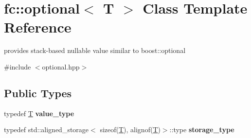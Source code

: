 \hypertarget{classfc_1_1optional}{}\section{fc\+:\+:optional$<$ T $>$ Class Template Reference}
\label{classfc_1_1optional}


provides stack-\/based nullable value similar to boost\+::optional  




{\ttfamily \#include $<$optional.\+hpp$>$}

\subsection*{Public Types}
\begin{DoxyCompactItemize}
\item 
\mbox{\label{classfc_1_1optional_a60c8ee406455667ec37c5ee2e69aa41c}} 
typedef \mbox{\hyperlink{struct_t}{T}} {\bfseries value\+\_\+type}
\item 
\mbox{\label{classfc_1_1optional_a98fda9ef912cd18e9b15d01afa08def6}} 
typedef std\+::aligned\+\_\+storage$<$ sizeof(\mbox{\hyperlink{struct_t}{T}}), alignof(\mbox{\hyperlink{struct_t}{T}})$>$\+::type {\bfseries storage\+\_\+type}
\end{DoxyCompactItemize}
